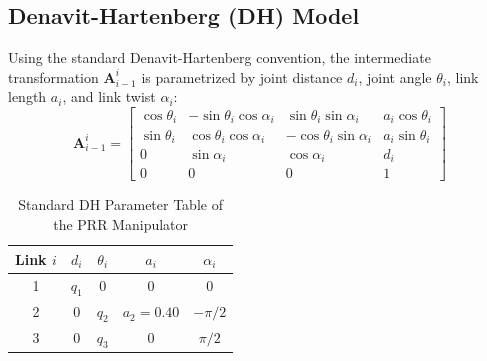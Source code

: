 \documentclass[11pt, a4paper]{article}
\begin{document}
\subsection{Denavit-Hartenberg (DH) Model}
Using the standard Denavit-Hartenberg convention, the intermediate transformation $\mathbf{A}_{i-1}^i$ is parametrized by joint distance $d_i$, joint angle $\theta_i$, link length $a_i$, and link twist $\alpha_i$:
\begin{equation}
    \mathbf{A}_{i-1}^i = 
    \begin{bmatrix}
        \cos\theta_i & -\sin\theta_i\cos\alpha_i & \sin\theta_i\sin\alpha_i & a_i\cos\theta_i \\
        \sin\theta_i & \cos\theta_i\cos\alpha_i & -\cos\theta_i\sin\alpha_i & a_i\sin\theta_i \\
        0 & \sin\alpha_i & \cos\alpha_i & d_i \\
        0 & 0 & 0 & 1
    \end{bmatrix}
\end{equation}

\begin{table}[htbp]
\centering
\caption{Standard DH Parameter Table of the PRR Manipulator}
\label{tab:dh}
\begin{tabular}{ccccc}
\toprule
\textbf{Link $i$} & $d_i$ & $\theta_i$ & $a_i$ & $\alpha_i$ \\
\midrule
1 & $q_1$ & 0 & 0 & 0 \\
2 & 0 & $q_2$ & $a_2 = 0.40$ & $-\pi/2$ \\
3 & 0 & $q_3$ & 0 & $\pi/2$ \\
\bottomrule
\end{tabular}
\end{table}
\end{document}
